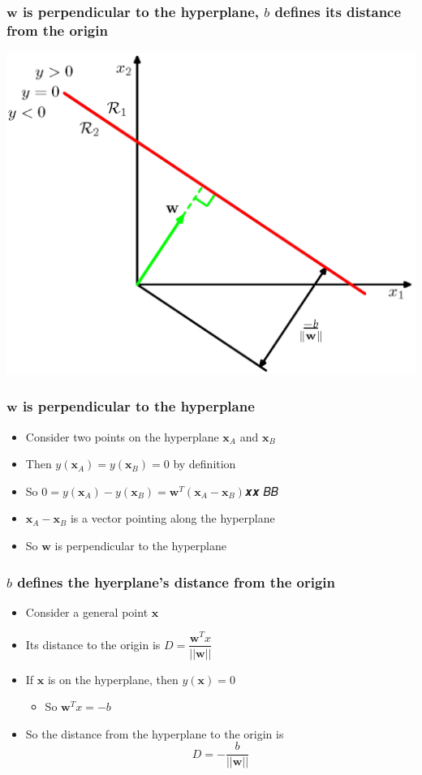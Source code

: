 \documentclass[12pt,notes,mathserif]{beamer}
\begin{document}
\begin{frame}[c]
	\frametitle{$\mathbf{w}$ is perpendicular to the hyperplane, $b$ defines its distance from the origin}
	\begin{center}
		\includegraphics[width=0.7\linewidth]{fig8/lec812.jpg}
	\end{center}
\end{frame}


\begin{frame}[c]
	\frametitle{$\mathbf{w}$ is perpendicular to the hyperplane}
	\begin{itemize}
		\item Consider two points on the hyperplane $\mathbf{x}_A$ and $\mathbf{x}_B$
		\item Then $y(\mathbf{x}_A)=y(\mathbf{x}_B)=0$ by definition
		\item So $0 =y(\mathbf{x}_A)− y(\mathbf{x}_B) = \mathbf{w}^T(\mathbf{x}_A-\mathbf{x}_B)$𝒙𝒙 𝐵𝐵
		\item $\mathbf{x}_A-\mathbf{x}_B$ is  a vector pointing along the hyperplane
		\item So $\mathbf{w}$ is perpendicular to the hyperplane
	\end{itemize}

\end{frame}





\begin{frame}[c]
	\frametitle{$b$ defines the hyerplane's distance from the origin}
	\begin{itemize}
		\item Consider a general point $\mathbf{x}$
		\item Its distance to the origin is $D=\dfrac{\mathbf{w}^Tx}{||\mathbf{w}||}$
		\item If $\mathbf{x}$ is on the hyperplane, then $y(\mathbf{x})=0$
		      \begin{itemize}
			      \item So $\mathbf{w}^T x=-b$
		      \end{itemize}
		\item So the distance from the hyperplane to the origin is
		      \[
			      D=-\dfrac{b}{||\mathbf{w}||}
		      \]
	\end{itemize}

\end{frame}
\end{document}
